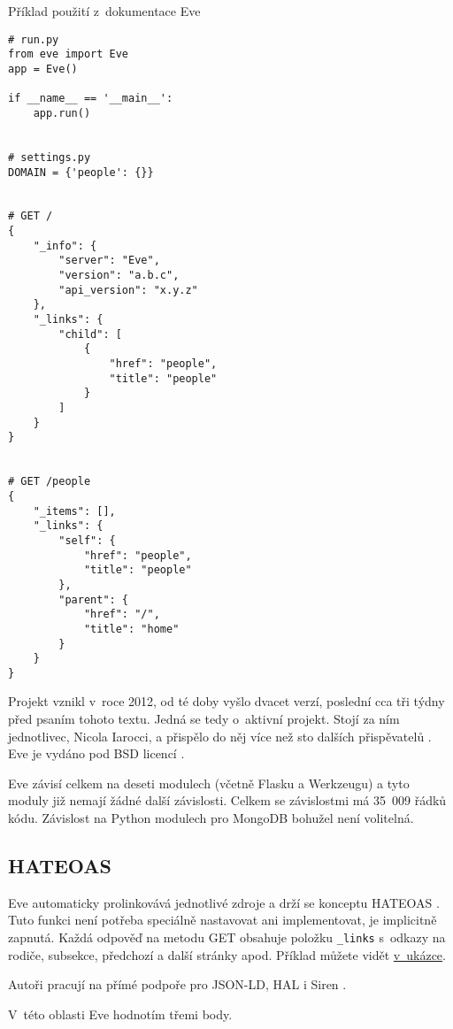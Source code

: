 \begin{listing}[htbp]
\caption{{\label{code:eve}Příklad použití z~dokumentace Eve \autocite{evedoc}}}
\begin{verbatim}
# run.py
from eve import Eve
app = Eve()

if __name__ == '__main__':
    app.run()


# settings.py
DOMAIN = {'people': {}}


# GET /
{
    "_info": {
        "server": "Eve",
        "version": "a.b.c",
        "api_version": "x.y.z"
    },
    "_links": {
        "child": [
            {
                "href": "people",
                "title": "people"
            }
        ]
    }
}


# GET /people
{
    "_items": [],
    "_links": {
        "self": {
            "href": "people",
            "title": "people"
        },
        "parent": {
            "href": "/",
            "title": "home"
        }
    }
}
\end{verbatim}
\end{listing}

Projekt vznikl v~roce 2012, od té doby vyšlo dvacet verzí, poslední cca tři týdny před psaním tohoto textu. Jedná se tedy o~aktivní projekt. Stojí za ním jednotlivec, Nicola Iarocci, a přispělo do něj více než sto dalších přispěvatelů \autocite{evecontributors}. Eve je vydáno pod BSD licencí \autocite{BSD3}.

Eve závisí celkem na deseti modulech (včetně Flasku a Werkzeugu) a tyto moduly již nemají žádné další závislosti. Celkem se závislostmi má 35~009 řádků kódu. Závislost na Python modulech pro MongoDB bohužel není volitelná.

\subsection{HATEOAS}\label{hateoas}

Eve automaticky prolinkovává jednotlivé zdroje a drží se konceptu HATEOAS \autocite{evehateoas}. Tuto funkci není potřeba speciálně nastavovat ani implementovat, je implicitně zapnutá. Každá odpověď na metodu GET obsahuje položku \verb!_links! s~odkazy na rodiče, subsekce, předchozí a další stránky apod. Příklad můžete vidět \protect\hyperlink{code:evehateoas}{v~ukázce}.

Autoři pracují na přímé podpoře pro JSON-LD, HAL i Siren \autocite{eveslides}.

V~této oblasti Eve hodnotím třemi body.

